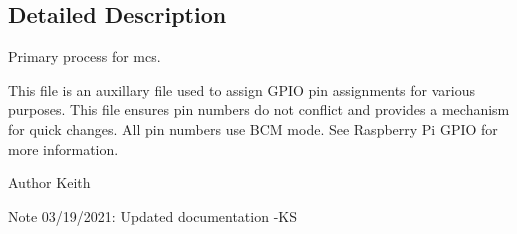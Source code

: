 \subsection{Detailed Description}
Primary process for mcs. 

This file is an auxillary file used to assign G\+P\+IO pin assignments for various purposes. This file ensures pin numbers do not conflict and provides a mechanism for quick changes. All pin numbers use B\+CM mode. See Raspberry Pi G\+P\+IO for more information. \begin{DoxyAuthor}{Author}
Keith 
\end{DoxyAuthor}
\begin{DoxyNote}{Note}
03/19/2021\+: Updated documentation -\/\+KS 
\end{DoxyNote}
